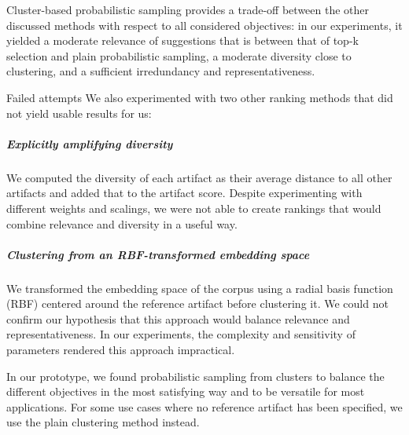 Cluster-based probabilistic sampling provides a trade-off between the other discussed methods with respect to all considered objectives:
in our experiments, it yielded a moderate relevance of suggestions that is between that of top-k selection and plain probabilistic sampling, a moderate diversity close to clustering, and a sufficient irredundancy and representativeness.

\begin{genericbox}{Failed attempts}
	We also experimented with two other ranking methods that did not yield usable results for us:

	\subparagraph{Explicitly amplifying diversity}
	We computed the diversity of each artifact as their average distance to all other artifacts and added that to the artifact score.
	Despite experimenting with different weights and scalings, we were not able to create rankings that would combine relevance and diversity in a useful way.

	\subparagraph{Clustering from an RBF-transformed embedding space}
	We transformed the embedding space of the corpus using a radial basis function (RBF) centered around the reference artifact before clustering it.
	We could not confirm our hypothesis that this approach would balance relevance and representativeness.
	In our experiments, the complexity and sensitivity of parameters rendered this approach impractical.
\end{genericbox}


In our prototype, we found probabilistic sampling from clusters to balance the different objectives in the most satisfying way and to be versatile for most applications.
For some use cases where no reference artifact has been specified, we use the plain clustering method instead.
